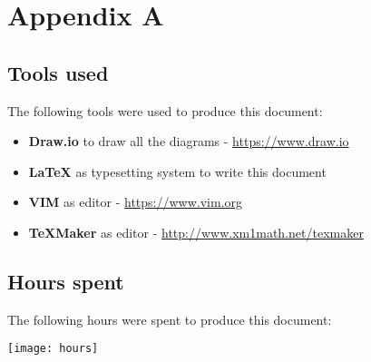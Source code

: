 \newpage
\section*{Appendix A}
\subsection*{Tools used}
The following tools were used to produce this document:
\begin{itemize}
    \item \textbf{Draw.io} to draw all the diagrams - \url{https://www.draw.io}
    \item \textbf{LaTeX} as typesetting system to write this document
    \item \textbf{VIM} as editor - \url{https://www.vim.org}
    \item \textbf{TeXMaker} as editor - \url{http://www.xm1math.net/texmaker}
\end{itemize}

\subsection*{Hours spent}
The following hours were spent to produce this document:

\texttt{[image: hours]}